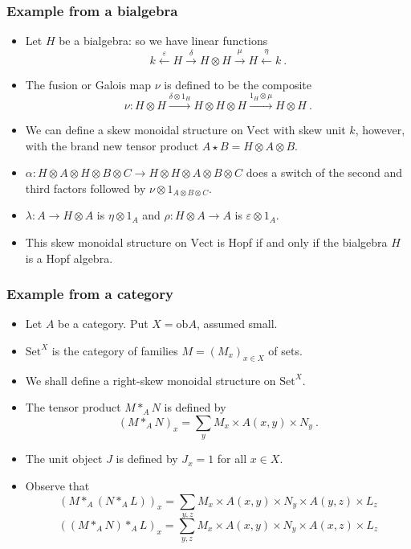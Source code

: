 \documentclass{beamer}
\newcommand{\lra}{\longrightarrow}
\newcommand{\lla}{\longleftarrow}
\begin{document}
\begin{frame}
  \frametitle{Example from a bialgebra}
  
 \begin{itemize}
\item<1->  Let $H$ be a bialgebra: so we have linear functions 
$$k \stackrel{\varepsilon}\lla H \stackrel{\delta}\lra H\otimes H \stackrel{\mu}\lra H\stackrel{\eta}\lla k \ .$$ 
\item<2-> The fusion or Galois map $\nu$ is defined to be the composite 
$$\nu : H\otimes H \stackrel{\delta \otimes 1_H}\lra H\otimes H\otimes H  \stackrel{1_H \otimes \mu}\lra H\otimes H \ .$$ 
\item<3-> We can define a skew monoidal structure on $\mathrm{Vect}$ with skew unit $k$, however, with the brand new tensor product $A\star B = H\otimes A \otimes B$.
\item<4-> $\alpha : H\otimes A\otimes H\otimes B\otimes C \lra H\otimes H\otimes A\otimes B\otimes C$ 
does a switch of the second and third factors followed by $\nu \otimes 1_{A\otimes B\otimes C}$.
\item<5-> $\lambda : A \lra H\otimes A$ is $\eta \otimes 1_A$ and $\rho : H\otimes A \lra A$ is $\varepsilon \otimes 1_A$.
\item<6-> This skew monoidal structure on $\mathrm{Vect}$ is Hopf if and only if the bialgebra $H$ is a Hopf algebra.
\end{itemize}

\end{frame}

\begin{frame}
  \frametitle{Example from a category}
  
 \begin{itemize}
\item<1->  Let $A$ be a category. Put $X=\mathrm{ob}A$, assumed small.
\item<2-> $\mathrm{Set}^X$ is the category of families $M=(M_x)_{x\in X}$ of sets. 
\item<3-> We shall define a right-skew monoidal structure on $\mathrm{Set}^X$.
\item<4-> The tensor product $M\ast_A N$ is defined by
$$(M\ast_A N)_x = \sum_y{M_x \times A(x,y) \times N_y} \ .$$
\item<5-> The unit object $J$ is defined by $J_x=1$ for all $x\in X$.
\item<6-> Observe that
$$(M\ast_A (N\ast_A L))_x = \sum_{y,z} {M_x \times A(x,y) \times N_y \times A(y,z)\times L_z}$$
$$((M\ast_A N)\ast_A L)_x = \sum_{y,z} {M_x \times A(x,y) \times N_y \times A(x,z)\times L_z} $$
\end{itemize}
\end{frame}
\end{document}
